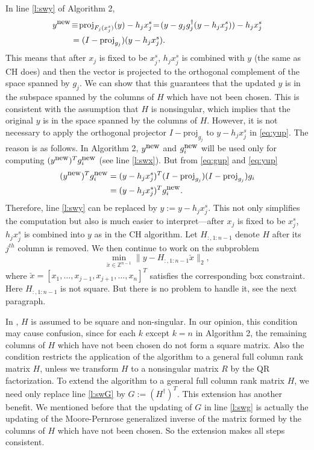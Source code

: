\documentclass[12pt,Bold,letterpaper]{mcgilletdclass}
\newcommand{\be}{\begin{equation}}
\newcommand{\ee}{\end{equation}}
\begin{document}
In line \ref{l:swy} of Algorithm 2,
\begin{align}
y^{\small \mbox{new}} & \!\equiv\! \mbox{proj}_{F_j(x_j^s)}(y) - h_jx_j^s 
 \!=\! (y -  g_jg_j^\dag(y-h_jx_j^s)) - h_jx_j^s  \nonumber \\
   &=  (I-\mbox{proj}_{g_j})(y-h_jx_j^s). \label{eq:yup}  
\end{align}
This means that after $x_j$ is fixed to be $x_j^s$, $h_jx_j^s$ is combined with $y$ (the same
as CH does)  and then the vector is projected to the orthogonal complement of 
the space spanned by $g_j$. 
We can show that this guarantees that the updated $y$ is in the subspace spanned by
the columns of $H$ which have not been chosen.
This is consistent with the assumption that $H$ is nonsingular, which implies that 
the original $y$  is in the space spanned by  the columns of $H$.
However, it is not necessary to apply the orthogonal projector $I- \mbox{proj}_{g_j}$ to $y-h_jx_j^s$ in \eqref{eq:yup}.
The reason is as follows. 
In Algorithm 2, $y^{\small \mbox{new}}$ and $g_i^{\small \mbox{new}}$ will be used only for computing 
$(y^{\small \mbox{new}})^Tg_i^{\small \mbox{new}}$ (see line \ref{l:swx}).
But from \eqref{eq:gup} and \eqref{eq:yup}
\begin{align*}
(y^{\small \mbox{new}})^Tg_i^{\small \mbox{new}}
& =(y-h_jx_j^s)^T(I-\mbox{proj}_{g_j})(I-\mbox{proj}_{g_j})g_i \\
&=(y-h_jx_j^s)^Tg_i^{\small \mbox{new}}.
\end{align*}
Therefore, line \ref{l:swy} can be replaced by $y:=y-h_jx_j^s$.
This not only simplifies the computation but also is much easier to interpret---after $x_j$ is fixed to be $x_j^s$,  
$h_jx_j^s$ is combined into $y$ as in the CH algorithm.
Let $H_{:,1:n-1}$ denote $H$ after its $j^{th}$ column is removed. 
We then continue to work on the subproblem
\be
\min_{\check{x}\in \mathbb{Z}^{n-1}}\|y-H_{:,1:n-1}\check{x}\|_2, 
\label{eq:subs}
\ee
where $\check{x}=[x_1,\ldots,x_{j-1},x_{j+1},\ldots,x_n]^T$ 
satisfies the corresponding box constraint.
Here $H_{:,1:n-1}$ is not square. But there is no problem to handle
it, see the next paragraph.

In \cite{SuW05},  $H$ is assumed to be square and non-singular. 
In our opinion, this condition may cause confusion,
since for each $k$ except $k=n$ in Algorithm 2, 
the remaining columns of $H$ which have not been chosen do not form a square matrix.
Also the condition restricts the application of the algorithm to a general full column rank matrix $H$,
unless we transform $H$ to a nonsingular matrix $R$ by the QR factorization.
To extend the algorithm to a general full column rank matrix $H$, we need only 
replace line \ref{l:swG} by $G:=(H^{\dagger})^T$.
This extension has another benefit. 
We mentioned before that the updating of $G$ in line \ref{l:swg}
is actually the updating of the Moore-Pernrose generalized inverse 
of the matrix formed by the columns of $H$ which have not been chosen. 
So the extension makes all steps consistent.
\end{document}
